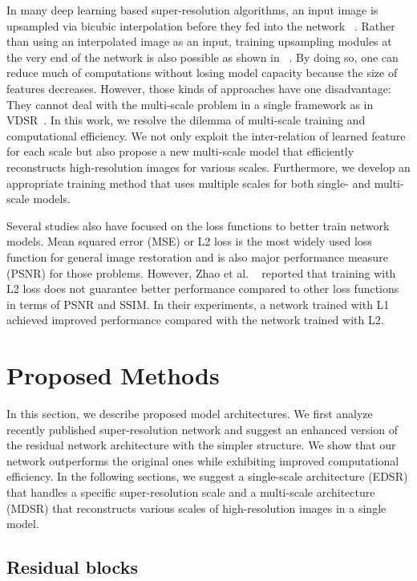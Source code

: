 \documentclass[10pt,twocolumn,letterpaper]{article}
\begin{document}
	In many deep learning based super-resolution algorithms, an input image is upsampled via bicubic interpolation before they fed into the network ~\cite{dong2014learning,kim2016accurate,kim2016deeply}. Rather than using an interpolated image as an input, training upsampling modules at the very end of the network is also possible as shown in ~\cite{dong2016accelerating, shi2016real, ledig2016photo}. By doing so, one can reduce much of computations without losing model capacity because the size of features decreases. However, those kinds of approaches have one disadvantage: They cannot deal with the multi-scale problem in a single framework as in VDSR~\cite{kim2016accurate}.
	In this work, we resolve the dilemma of multi-scale training and computational efficiency. 
	We not only exploit the inter-relation of learned feature for each scale but also propose a new multi-scale model that efficiently reconstructs high-resolution images for various scales. 
	Furthermore, we develop an appropriate training method that uses multiple scales for both single- and multi-scale models. 
	
	Several studies also have focused on the loss functions to better train network models. 
	Mean squared error (MSE) or L2 loss is the most widely used loss function for general image restoration and is also major performance measure (PSNR) for those problems.
	However, Zhao et al. ~\cite{zhao2015loss} reported that training with L2 loss does not guarantee better performance compared to other loss functions in terms of PSNR and SSIM.
	In their experiments, a network trained with L1 achieved improved performance compared with the network trained with L2.
	
	\section{Proposed Methods}
	
	In this section, we describe proposed model architectures. 
	We first analyze recently published super-resolution network and suggest an enhanced version of the residual network architecture with the simpler structure. 
	We show that our network outperforms the original ones while exhibiting improved computational efficiency. 
	In the following sections, we suggest a single-scale architecture (EDSR) that handles a specific super-resolution scale and a multi-scale architecture (MDSR) that reconstructs various scales of high-resolution images in a single model.
	
	\subsection{Residual blocks}
	\label{sec_3_resnet}
	
\end{document}
